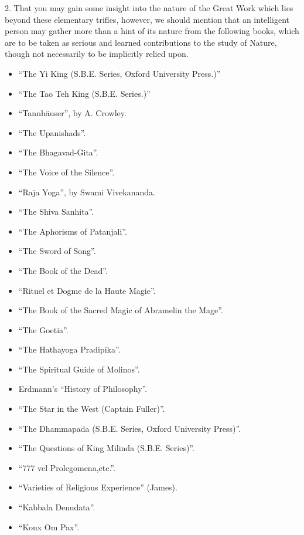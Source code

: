 2. That you may gain some insight into the nature of the Great Work which lies beyond these elementary trifles, however, we should mention that an intelligent person may gather more than a hint of its nature from the following books, which are to be taken as serious and learned contributions to the study of Nature, though not necessarily to be implicitly relied upon.

\begin{itemize}[label={}]
\item \enquote{The Yi King (S.B.E. Series, Oxford University Press.)}
\item \enquote{The Tao Teh King (S.B.E. Series.)}
\item \enquote{Tannh\"{a}user}, by A. Crowley.
\item \enquote{The Upanishads}.
\item \enquote{The Bhagavad-Gita}.
\item \enquote{The Voice of the Silence}.
\item \enquote{Raja Yoga}, by Swami Vivekananda.
\item \enquote{The Shiva Sanhita}.
\item \enquote{The Aphorisms of Patanjali}.
\item \enquote{The Sword of Song}.
\item \enquote{The Book of the Dead}.
\item \enquote{Rituel et Dogme de la Haute Magie}.
\item \enquote{The Book of the Sacred Magic of Abramelin the Mage}.
\item \enquote{The Goetia}.
\item \enquote{The Hathayoga Pradipika}.
\item \enquote{The Spiritual Guide of Molinos}.
\item Erdmann's \enquote{History of Philosophy}.
\item \enquote{The Star in the West (Captain Fuller)}.
\item \enquote{The Dhammapada (S.B.E. Series, Oxford University Press)}.
\item \enquote{The Questions of King Milinda (S.B.E. Series)}.
\item \enquote{777 vel Prolegomena,etc.}.
\item \enquote{Varieties of Religious Experience} (James).
\item \enquote{Kabbala Denudata}.
\item \enquote{Konx Om Pax}.
\end{itemize}

